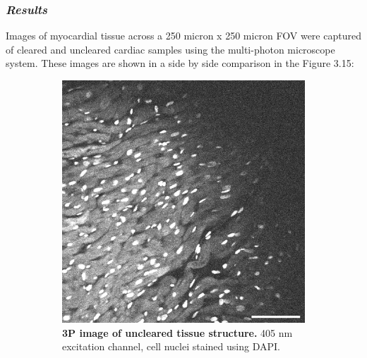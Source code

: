\subsubsection{\textit{Results}}

Images of myocardial tissue across a 250 micron x 250 micron FOV were captured of cleared and uncleared cardiac samples using the multi-photon microscope system. These images are shown in a side by side comparison in the  Figure 3.15:

\begin{figure}[H]
\centering
\begin{subfigure}[t]{0.475\textwidth}
\includegraphics[width=1\linewidth]{Images/Uncleared_Structure.png}
\caption{\textbf{3P image of uncleared tissue structure.} 405 nm excitation channel, cell nuclei stained using DAPI.}
\label{fig:enter-label}
\end{subfigure}
~
\begin{subfigure}[t]{0.475\textwidth}

\end{subfigure}
\end{figure}

